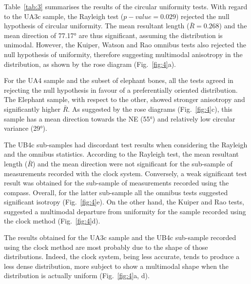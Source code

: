 \documentclass[review,authoryear,times]{elsarticle} %
\begin{document}
Table~\ref{tab:3} summarises the results of the circular uniformity tests.
With regard to the UA3c sample, the Rayleigh test ($p-value=0.029$) rejected the null hypothesis of circular uniformity. The mean resultant length ($\bar{R}=0.268$) and the mean direction of 77.17° are thus significant, assuming the distribution is unimodal. However, the Kuiper, Watson and Rao omnibus tests also rejected the null hypothesis of uniformity, therefore suggesting multimodal anisotropy in the distribution, as shown by the rose diagram (Fig.~\ref{fig:4}a).

For the UA4 sample and the subset of elephant bones, all the tests agreed in rejecting the null hypothesis in favour of a preferentially oriented distribution. The Elephant sample, with respect to the other, showed stronger anisotropy and significantly higher $\bar{R}$. As suggested by the rose diagrams (Fig.~\ref{fig:4}c), this sample has a mean direction towards the NE (55°) and relatively low circular variance (29°).

The UB4c sub-samples had discordant test results when considering the Rayleigh and the omnibus statistics. According to the Rayleigh test, the mean resultant length ($\bar{R}$) and the mean direction were not significant for the sub-sample of measurements recorded with the clock system. Conversely, a weak significant test result was obtained for the sub-sample of measurements recorded using the compass. Overall, for the latter sub-sample all the omnibus tests suggested significant isotropy (Fig.~\ref{fig:4}e). On the other hand, the Kuiper and Rao tests, suggested a multimodal departure from uniformity for the sample recorded using the clock method (Fig.~\ref{fig:4}d).

The results obtained for the UA3c sample and the UB4c sub-sample recorded using the clock method are most probably due to the shape of those distributions. Indeed, the clock system, being less accurate, tends to produce a less dense distribution, more subject to show a multimodal shape when the distribution is actually uniform (Fig.~\ref{fig:4}a, d).
\end{document}
